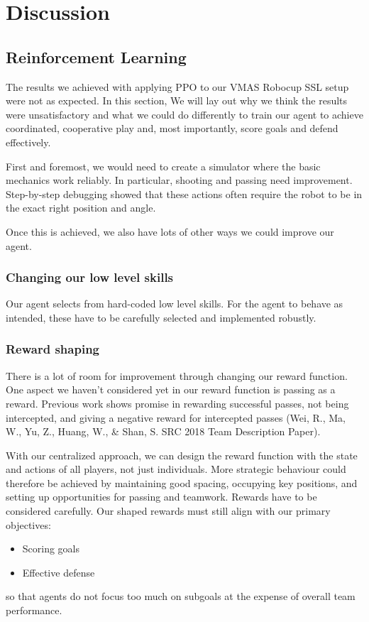 \section{Discussion}
\label{section:disc}

\subsection{Reinforcement Learning}
The results we achieved with applying PPO to our VMAS Robocup SSL setup were not as expected.
In this section, We will lay out why we think the results were unsatisfactory and what we could do differently to train our agent to achieve coordinated, cooperative play and, most importantly, score goals and defend effectively.

First and foremost, we would need to create a simulator where the basic mechanics work reliably. In particular, shooting and passing need improvement. Step-by-step debugging showed that these actions often require the robot to be in the exact right position and angle.

Once this is achieved, we also have lots of other ways we could improve our agent.

\subsubsection{Changing our low level skills}
Our agent selects from hard-coded low level skills. For the agent to behave as intended, these have to be carefully selected and implemented robustly.

\subsubsection{Reward shaping}
There is a lot of room for improvement through changing our reward function.
One aspect we haven't considered yet in our reward function is passing as a reward.
Previous work shows promise in rewarding successful passes, not being intercepted, and giving a negative reward for intercepted passes
(Wei, R., Ma, W., Yu, Z., Huang, W., \& Shan, S. SRC 2018 Team Description Paper).

With our centralized approach, we can design the reward function with the state and actions of all players, not just individuals.
More strategic behaviour could therefore be achieved by maintaining good spacing, occupying key positions, and setting up opportunities for passing and teamwork.
Rewards have to be considered carefully. Our shaped rewards must still align with our primary objectives:
\begin{itemize}
    \item Scoring goals
    \item Effective defense
\end{itemize}
so that agents do not focus too much on subgoals at the expense of overall team performance.

